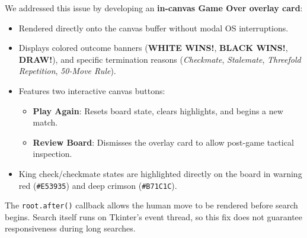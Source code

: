 \documentclass[11pt,a4paper]{article}
\begin{document}
We addressed this issue by developing an \textbf{in-canvas Game Over overlay card}:
\begin{itemize}[leftmargin=*]
    \item Rendered directly onto the canvas buffer without modal OS interruptions.
    \item Displays colored outcome banners (\textbf{WHITE WINS!}, \textbf{BLACK WINS!}, \textbf{DRAW!}), and specific termination reasons (\textit{Checkmate}, \textit{Stalemate}, \textit{Threefold Repetition}, \textit{50-Move Rule}).
    \item Features two interactive canvas buttons:
    \begin{itemize}
        \item \textbf{Play Again}: Resets board state, clears highlights, and begins a new match.
        \item \textbf{Review Board}: Dismisses the overlay card to allow post-game tactical inspection.
    \end{itemize}
    \item King check/checkmate states are highlighted directly on the board in warning red (\texttt{\#E53935}) and deep crimson (\texttt{\#B71C1C}).
\end{itemize}
The \texttt{root.after()} callback allows the human move to be rendered before search begins. Search itself runs on Tkinter's event thread, so this fix does not guarantee responsiveness during long searches.
\end{document}
